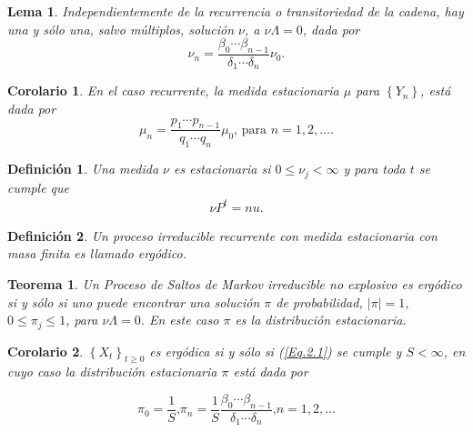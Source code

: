 \documentclass{article}
\newtheorem{Def}{Definición}[section]
\newtheorem{Teo}{Teorema}[section]
\newtheorem{Cor}{Corolario}[section]
\newtheorem{Lema}{Lema}[section]
\numberwithin{equation}{section}
\begin{document}
\begin{Lema}
Independientemente de la recurrencia o transitoriedad de la cadena, hay una y s\'olo una, salvo m\'ultiplos, soluci\'on $\nu$, a $\nu\Lambda=0$, dada por
\begin{equation}\label{Eq.2.2}
\nu_{n}=\frac{\beta_{0}\cdots\beta_{n-1}}{\delta_{1}\cdots\delta_{n}}\nu_{0}.
\end{equation}
\end{Lema}

\begin{Cor}\label{Corolario2.3}
En el caso recurrente, la medida estacionaria $\mu$ para $\left\{Y_{n}\right\}$, est\'a dada por
\begin{equation}\label{Eq.2.3}
\mu_{n}=\frac{p_{1}\cdots p_{n-1}}{q_{1}\cdots q_{n}}\mu_{0}\textrm{, para }n=1,2,\ldots.
\end{equation}
\end{Cor}

\begin{Def}
Una medida $\nu$ es estacionaria si $0\leq\nu_{j}<\infty$ y para toda $t$ se cumple que 
\begin{eqnarray}
\nu P^{t}=nu.
\end{eqnarray}
\end{Def}


\begin{Def}
Un proceso irreducible recurrente con medida estacionaria con masa finita es llamado erg\'odico.
\end{Def}

\begin{Teo}\label{Teo4.3}
Un Proceso de Saltos de Markov irreducible no explosivo es erg\'odico si y s\'olo si uno puede encontrar una soluci\'on $\pi$ de probabilidad, $|\pi|=1$, $0\leq\pi_{j}\leq1$, para $\nu\Lambda=0$. En este caso $\pi$ es la distribuci\'on estacionaria.
\end{Teo}
\begin{Cor}\label{Corolario2.4}
$\left\{X_{t}\right\}_{t\geq0}$ es erg\'odica si y s\'olo si (\ref{Eq.2.1}) se cumple y $S<\infty$, en cuyo caso la distribuci\'on estacionaria $\pi$ est\'a dada por

\begin{equation}\label{Eq.2.4}
\pi_{0}=\frac{1}{S}\textrm{,
}\pi_{n}=\frac{1}{S}\frac{\beta_{0}\cdots\beta_{n-1}}{\delta_{1}\cdots\delta_{n}}\textrm{,
}n=1,2,\ldots
\end{equation}
\end{Cor}
\end{document}
